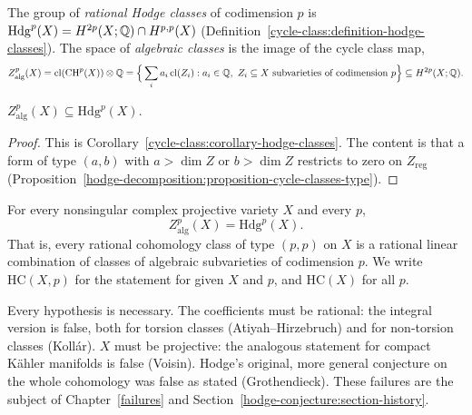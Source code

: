 \begin{definition}\label{hodge-conjecture:definition-algebraic-classes}
The group of \emph{rational Hodge classes} of codimension $p$ is $\mathrm{Hdg}^p(X) = H^{2p}(X; \mathbb{Q}) \cap H^{p,p}(X)$ (Definition~\ref{cycle-class:definition-hodge-classes}). The space
of \emph{algebraic classes} is the image of the cycle class map,
\[
Z^p_{\mathrm{alg}}(X) = \mathrm{cl}(\operatorname{CH}^p(X)) \otimes \mathbb{Q} = \Big\{\sum_ia_i\,\mathrm{cl}(Z_i) : a_i \in \mathbb{Q},\ Z_i \subseteq X \text{ subvarieties of codimension } p\Big\} \subseteq H^{2p}(X; \mathbb{Q}).
\]
\end{definition}

\begin{proposition}\label{hodge-conjecture:proposition-easy-inclusion}
$Z^p_{\mathrm{alg}}(X) \subseteq \mathrm{Hdg}^p(X)$.
\end{proposition}

\begin{proof}
This is Corollary~\ref{cycle-class:corollary-hodge-classes}. The content is that a form of type $(a, b)$ with $a > \dim Z$ or $b > \dim Z$ restricts to zero on $Z_{\mathrm{reg}}$
(Proposition~\ref{hodge-decomposition:proposition-cycle-classes-type}).
\end{proof}

\begin{conjecture}\label{hodge-conjecture:conjecture-hodge}
For every nonsingular complex projective variety $X$ and every $p$,
\[
Z^p_{\mathrm{alg}}(X) = \mathrm{Hdg}^p(X).
\]
That is, every rational cohomology class of type $(p,p)$ on $X$ is a rational linear combination of classes of algebraic subvarieties of codimension $p$. We write $\mathrm{HC}(X, p)$
for the statement for given $X$ and $p$, and $\mathrm{HC}(X)$ for all $p$.
\end{conjecture}

\begin{remark}\label{hodge-conjecture:remark-load-bearing}
Every hypothesis is necessary. The coefficients must be rational: the integral version is false, both for torsion classes (Atiyah--Hirzebruch) and for non-torsion classes (Koll\'ar).
$X$ must be projective: the analogous statement for compact K\"ahler manifolds is false (Voisin). Hodge's original, more general conjecture on the whole cohomology was false as stated
(Grothendieck). These failures are the subject of Chapter~\ref{failures} and Section~\ref{hodge-conjecture:section-history}.
\end{remark}

